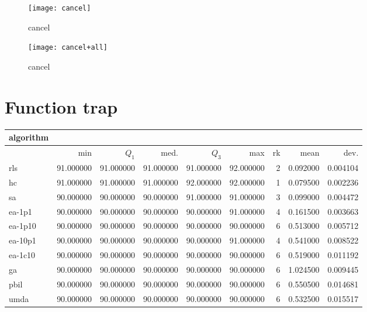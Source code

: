 \begin{center}
\begin{figure}[h]
\centering
\texttt{[image: cancel]}
\caption{cancel}
\end{figure}
\end{center}

\begin{center}
\begin{figure}[h]
\centering
\texttt{[image: cancel+all]}
\caption{cancel}
\end{figure}
\end{center}

\newpage

\section{Function trap}
\begin{center}
\begin{tabular}{@{}l*{5}{>{{}}N{3}{0}}>{{}}N{2}{0}N{1}{3}N{1}{3}@{}}
\toprule
{algorithm} &  &  \\
\midrule
& {min} & {$Q_1$} & {med.} & {$Q_3$} & {max} & {rk} & {mean} & {dev.} \\
\midrule
rls & {\color{blue}} 91.000000 & {\color{blue}} 91.000000 & {\color{blue}} 91.000000 & 91.000000 & {\color{blue}} 92.000000 & 2 & 0.092000 & 0.004104 \\
 hc & {\color{blue}} 91.000000 & {\color{blue}} 91.000000 & {\color{blue}} 91.000000 & {\color{blue}} 92.000000 & {\color{blue}} 92.000000 & 1 & 0.079500 & 0.002236 \\
 sa & 90.000000 & 90.000000 & 90.000000 & 91.000000 & 91.000000 & 3 & 0.099000 & 0.004472 \\
 ea-1p1 & 90.000000 & 90.000000 & 90.000000 & 90.000000 & 91.000000 & 4 & 0.161500 & 0.003663 \\
 ea-1p10 & 90.000000 & 90.000000 & 90.000000 & 90.000000 & 90.000000 & 6 & 0.513000 & 0.005712 \\
 ea-10p1 & 90.000000 & 90.000000 & 90.000000 & 90.000000 & 91.000000 & 4 & 0.541000 & 0.008522 \\
 ea-1c10 & 90.000000 & 90.000000 & 90.000000 & 90.000000 & 90.000000 & 6 & 0.519000 & 0.011192 \\
 ga & 90.000000 & 90.000000 & 90.000000 & 90.000000 & 90.000000 & 6 & 1.024500 & 0.009445 \\
 pbil & 90.000000 & 90.000000 & 90.000000 & 90.000000 & 90.000000 & 6 & 0.550500 & 0.014681 \\
 umda & 90.000000 & 90.000000 & 90.000000 & 90.000000 & 90.000000 & 6 & 0.532500 & 0.015517 \\
 \bottomrule
\end{tabular}
\end{center}

